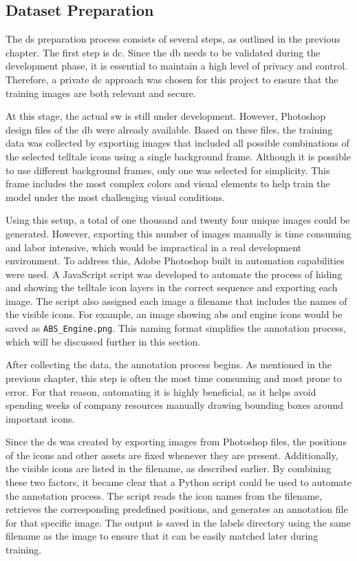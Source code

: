 \subsection{Dataset Preparation}
The \gls{ds} preparation process consists of several steps, as outlined in the previous chapter. The first step is \gls{dc}. Since the \gls{db} needs to be validated during the development phase, it is essential to maintain a high level of privacy and control. Therefore, a private \gls{dc} approach was chosen for this project to ensure that the training images are both relevant and secure.

At this stage, the actual \gls{sw} is still under development. However, Photoshop design files of the \gls{db} were already available. Based on these files, the training data was collected by exporting images that included all possible combinations of the selected telltale icons using a single background frame. Although it is possible to use different background frames, only one was selected for simplicity. This frame includes the most complex colors and visual elements to help train the model under the most challenging visual conditions.

Using this setup, a total of one thousand and twenty four unique images could be generated. However, exporting this number of images manually is time consuming and labor intensive, which would be impractical in a real development environment. To address this, Adobe Photoshop built in automation capabilities were used. A JavaScript script was developed to automate the process of hiding and showing the telltale icon layers in the correct sequence and exporting each image. The script also assigned each image a filename that includes the names of the visible icons. For example, an image showing \gls{abs} and engine icons would be saved as \texttt{ABS\_Engine.png}. This naming format simplifies the annotation process, which will be discussed further in this section.

After collecting the data, the annotation process begins. As mentioned in the previous chapter, this step is often the most time consuming and most prone to error. For that reason, automating it is highly beneficial, as it helps avoid spending weeks of company resources manually drawing bounding boxes around important icons.

Since the \gls{ds} was created by exporting images from Photoshop files, the positions of the icons and other assets are fixed whenever they are present. Additionally, the visible icons are listed in the filename, as described earlier. By combining these two factors, it became clear that a Python script could be used to automate the annotation process. The script reads the icon names from the filename, retrieves the corresponding predefined positions, and generates an annotation file for that specific image. The output is saved in the labels directory using the same filename as the image to ensure that it can be easily matched later during training.

